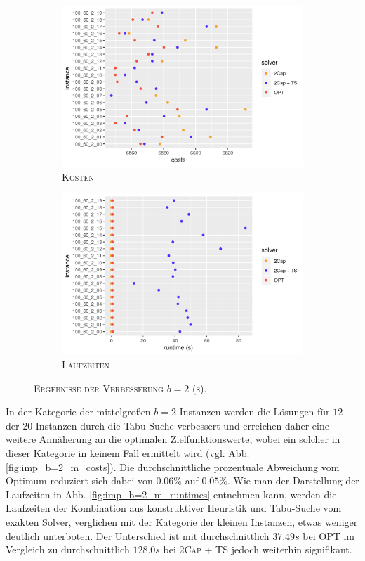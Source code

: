 \begin{figure}[H]
\centering
\begin{subfigure}[b]{0.49\textwidth}
\includegraphics[width=\textwidth]{img/imp_b=2_s_costs.png}
\caption{\textsc{Kosten}}
\label{fig:imp_b=2_s_costs}
\end{subfigure}
\hfill
\begin{subfigure}[b]{0.49\textwidth}
\includegraphics[width=\textwidth]{img/imp_b=2_s_runtimes.png}
\caption{\textsc{Laufzeiten}}
\label{fig:imp_b=2_s_runtimes}
\end{subfigure}
\caption{\textsc{Ergebnisse der Verbesserung $b = 2$ (s)}.}
\label{fig:imp_res_b=2_s}
\end{figure}

In der Kategorie der mittelgroßen $b = 2$ Instanzen werden die Lösungen für $12$ der $20$ Instanzen durch
die Tabu-Suche verbessert und erreichen daher eine weitere Annäherung an die optimalen Zielfunktionswerte,
wobei ein solcher in dieser Kategorie in keinem Fall ermittelt wird (vgl. Abb. \ref{fig:imp_b=2_m_costs}).
Die durchschnittliche prozentuale Abweichung vom Optimum reduziert sich dabei von $0.06 \%$ auf $0.05 \%$.
Wie man der Darstellung der Laufzeiten in Abb. \ref{fig:imp_b=2_m_runtimes} entnehmen kann, werden die
Laufzeiten der Kombination aus konstruktiver Heuristik und Tabu-Suche vom exakten Solver, verglichen
mit der Kategorie der kleinen Instanzen, etwas weniger deutlich unterboten. Der Unterschied ist mit
durchschnittlich $37.49s$ bei \textsc{OPT} im Vergleich zu durchschnittlich $128.0s$ bei \textsc{2Cap + TS}
jedoch weiterhin signifikant.

